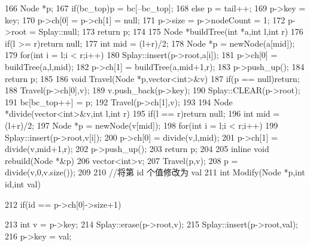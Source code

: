 \documentclass[11pt]{article}
\begin{document}
\begin{Code}
{{166              Node *p;
167              if(bc_top)p = bc[--bc_top];
168              else p = tail++;
169              p->key = key;
170              p->ch[0] = p->ch[1] = null;
171              p->size = p->nodeCount = 1;
172              p->root = Splay::null;
173              return p;
174       }
175       Node *buildTree(int *a,int l,int r){
176           if(l >= r)return null;
177           int mid = (l+r)/2;
178           Node *p = newNode(a[mid]);
179           for(int i = l;i < r;i++)
180               Splay::insert(p->root,a[i]);
181           p->ch[0] = buildTree(a,l,mid);
182           p->ch[1] = buildTree(a,mid+1,r);
183           p->push_up();
184           return p;
185       }
186       void Travel(Node *p,vector<int>&v){
187           if(p == null)return;
188           Travel(p->ch[0],v);
189           v.push_back(p->key);
190           Splay::CLEAR(p->root);
191           bc[bc_top++] = p;
192           Travel(p->ch[1],v);
193       }
194       Node *divide(vector<int>&v,int l,int r){
195           if(l == r)return null;
196           int mid = (l+r)/2;
197           Node *p = newNode(v[mid]);
198           for(int i = l;i < r;i++)
199               Splay::insert(p->root,v[i]);
200           p->ch[0] = divide(v,l,mid);
201           p->ch[1] = divide(v,mid+1,r);
202           p->push_up();
203           return p;
204       }
205       inline void rebuild(Node *&p){
206           vector<int>v;
207           Travel(p,v);
208           p = divide(v,0,v.size());
209       }
210       //将第 id 个值修改为 val
211       int Modify(Node *p,int id,int val){
212           if(id == p->ch[0]->size+1){
213               int v = p->key;
214               Splay::erase(p->root,v);
215               Splay::insert(p->root,val);
216               p->key = val;


}}}
\end{Code}
\end{document}
